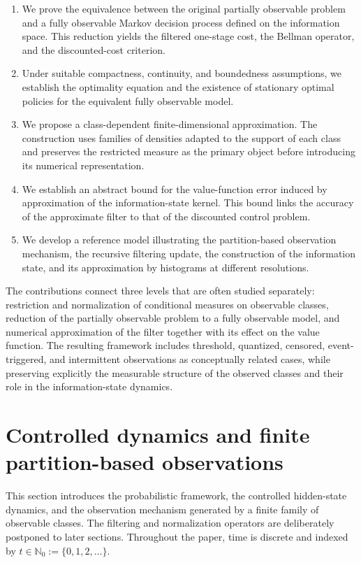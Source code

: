 \documentclass[10pt,twocolumn]{article}
\theoremstyle{remark}
\newcommand{\N}{\mathbb{N}}
\begin{document}
\begin{enumerate}
	\item We prove the equivalence between the original partially observable problem and a fully observable Markov decision process defined on the information space. This reduction yields the filtered one-stage cost, the Bellman operator, and the discounted-cost criterion.
	
	\item Under suitable compactness, continuity, and boundedness assumptions, we establish the optimality equation and the existence of stationary optimal policies for the equivalent fully observable model.
	
	\item We propose a class-dependent finite-dimensional approximation. The construction uses families of densities adapted to the support of each class and preserves the restricted measure as the primary object before introducing its numerical representation.
	
	\item We establish an abstract bound for the value-function error induced by approximation of the information-state kernel. This bound links the accuracy of the approximate filter to that of the discounted control problem.
	
	\item We develop a reference model illustrating the partition-based observation mechanism, the recursive filtering update, the construction of the information state, and its approximation by histograms at different resolutions.
\end{enumerate}

The contributions connect three levels that are often studied separately: restriction and normalization of conditional measures on observable classes, reduction of the partially observable problem to a fully observable model, and numerical approximation of the filter together with its effect on the value function. The resulting framework includes threshold, quantized, censored, event-triggered, and intermittent observations as conceptually related cases, while preserving explicitly the measurable structure of the observed classes and their role in the information-state dynamics.

\section{Controlled dynamics and finite partition-based observations}
\label{sec:model}

This section introduces the probabilistic framework, the controlled hidden-state dynamics, and the observation mechanism generated by a finite family of observable classes. The filtering and normalization operators are deliberately postponed to later sections. Throughout the paper, time is discrete and indexed by $t\in\N_0:=\{0,1,2,\ldots\}$.
\end{document}
